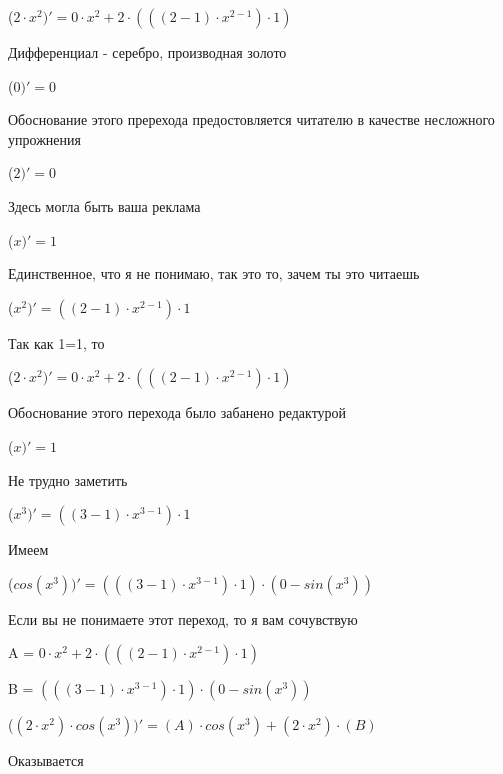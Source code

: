\documentclass[12pt,a4paper,fleqn]{article}
\begin{document}
\begin{center}
 ($2 \cdot x^{2})'
  = 0 \cdot x^{2}+2 \cdot (((2-1) \cdot x^{2-1}) \cdot 1)$\end{center}
Дифференциал - серебро, производная золото\cite{link2}

\begin{center}
 ($0)'
  = 0$\end{center}
Обоснование этого пререхода предостовляется читателю в качестве несложного упрожнения

\begin{center}
 ($2)'
  = 0$\end{center}
Здесь могла быть ваша реклама

\begin{center}
 ($x)'
  = 1$\end{center}
Единственное, что я не понимаю, так это то, зачем ты это читаешь

\begin{center}
 ($x^{2})'
  = ((2-1) \cdot x^{2-1}) \cdot 1$\end{center}
Так как 1=1, то\cite{link4}

\begin{center}
 ($2 \cdot x^{2})'
  = 0 \cdot x^{2}+2 \cdot (((2-1) \cdot x^{2-1}) \cdot 1)$\end{center}
Обоснование этого перехода было забанено редактурой

\begin{center}
 ($x)'
  = 1$\end{center}
Не трудно заметить

\begin{center}
 ($x^{3})'
  = ((3-1) \cdot x^{3-1}) \cdot 1$\end{center}
Имеем

\begin{center}
 ($cos(x^{3}))'
  = (((3-1) \cdot x^{3-1}) \cdot 1) \cdot (0-sin(x^{3}))$\end{center}
Если вы не понимаете этот переход, то я вам сочувствую

\begin{center}
A = $0 \cdot x^{2}+2 \cdot (((2-1) \cdot x^{2-1}) \cdot 1)$\end{center}
\begin{center}
B = $(((3-1) \cdot x^{3-1}) \cdot 1) \cdot (0-sin(x^{3}))$\end{center}
\begin{center}
 ($(2 \cdot x^{2}) \cdot cos(x^{3}))'
  = (A) \cdot cos(x^{3})+(2 \cdot x^{2}) \cdot (B)$\end{center}
Оказывается
\end{document}

